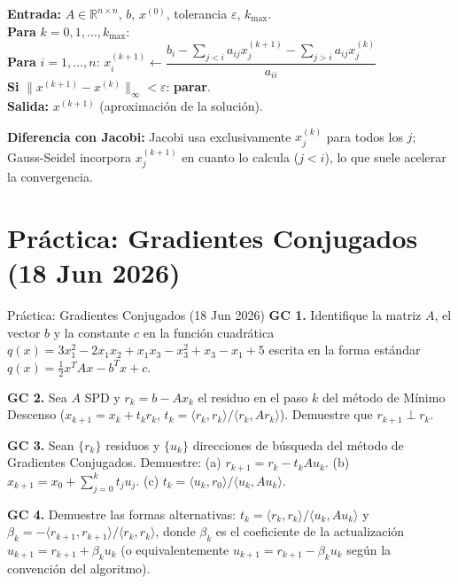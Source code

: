 \documentclass[11pt,a4paper]{article}
\begin{document}
\begin{tcolorbox}[algo,
                  title={Pseudocódigo Gauss-Seidel ($n$ variables)}]
\textbf{Entrada:} $A\in\mathbb{R}^{n\times n}$, $b$, $x^{(0)}$, tolerancia $\varepsilon$, $k_{\max}$.\\[2pt]
\textbf{Para} $k = 0, 1, \ldots, k_{\max}$:\\[2pt]
\quad\textbf{Para} $i = 1, \ldots, n$: \quad
  $x_i^{(k+1)} \leftarrow \dfrac{b_i - \sum_{j<i}a_{ij}x_j^{(k+1)} - \sum_{j>i}a_{ij}x_j^{(k)}}{a_{ii}}$\\[6pt]
\quad\textbf{Si} $\bigl\|x^{(k+1)}-x^{(k)}\bigr\|_\infty < \varepsilon$: \textbf{parar}.\\[2pt]
\textbf{Salida:} $x^{(k+1)}$ (aproximación de la solución).
\end{tcolorbox}

\textbf{Diferencia con Jacobi:} Jacobi usa exclusivamente $x_j^{(k)}$ para todos los $j$;
Gauss-Seidel incorpora $x_j^{(k+1)}$ en cuanto lo calcula ($j < i$),
lo que suele acelerar la convergencia.

\section{Práctica: Gradientes Conjugados (18 Jun 2026)}
\label{sec:practica_gc}

\begin{examen}{Práctica: Gradientes Conjugados (18 Jun 2026)}
\textbf{GC 1.} Identifique la matriz $A$, el vector $b$ y la constante $c$ en la función cuadrática $q(x)=3x_1^2-2x_1x_2+x_1x_3-x_3^2+x_3-x_1+5$ escrita en la forma estándar $q(x)=\tfrac{1}{2}x^TAx-b^Tx+c$.

\smallskip\textbf{GC 2.} Sea $A$ SPD y $r_k=b-Ax_k$ el residuo en el paso $k$ del método de Mínimo Descenso ($x_{k+1}=x_k+t_kr_k$, $t_k=\langle r_k,r_k\rangle/\langle r_k,Ar_k\rangle$). Demuestre que $r_{k+1}\perp r_k$.

\smallskip\textbf{GC 3.} Sean $\{r_k\}$ residuos y $\{u_k\}$ direcciones de búsqueda del método de Gradientes Conjugados. Demuestre: (a) $r_{k+1}=r_k-t_kAu_k$. (b) $x_{k+1}=x_0+\sum_{j=0}^kt_ju_j$. (c) $t_k=\langle u_k,r_0\rangle/\langle u_k,Au_k\rangle$.

\smallskip\textbf{GC 4.} Demuestre las formas alternativas: $t_k=\langle r_k,r_k\rangle/\langle u_k,Au_k\rangle$ y $\beta_k=-\langle r_{k+1},r_{k+1}\rangle/\langle r_k,r_k\rangle$, donde $\beta_k$ es el coeficiente de la actualización $u_{k+1}=r_{k+1}+\beta_ku_k$ (o equivalentemente $u_{k+1}=r_{k+1}-\beta_ku_k$ según la convención del algoritmo).
\end{examen}
\end{document}
